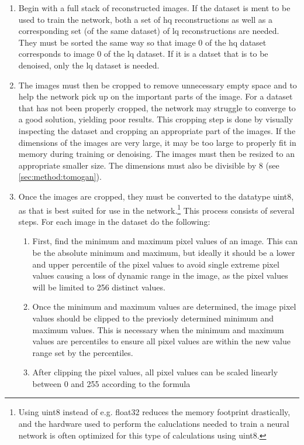 \begin{enumerate}
    \item Begin with a full stack of reconstructed images. If the dataset is ment to be used to train the network, both a set of \gls{hq} reconstructions as well as a corresponding set (of the same dataset) of \gls{lq} reconstructions are needed. They must be sorted the same way so that image 0 of the \gls{hq} dataset corresponds to image 0 of the \gls{lq} dataset. If it is a datset that is to be denoised, only the \gls{lq} dataset is needed. 
    \item The images must then be cropped to remove unnecessary empty space and to help the network pick up on the important parts of the image. For a dataset that has not been properly cropped, the network may struggle to converge to a good solution, yielding poor results. This cropping step is done by visually inspecting the dataset and cropping an appropriate part of the images. If the dimensions of the images are very large, it may be too large to properly fit in memory during training or denoising. The images must then be resized to an appropriate smaller size. The dimensions must also be divisible by $8$ (see \cref{sec:method:tomogan}).
    \item Once the images are cropped, they must be converted to the datatype uint8, as that is best suited for use in the network.\footnote{Using uint8 instead of e.g. float32 reduces the memory footprint drastically, and the hardware used to perform the caluclations needed to train a neural network is often optimized for this type of calculations using uint8. } This process consists of several steps. For each image in the dataset do the following:
    \begin{enumerate}
        \item First, find the minimum and maximum pixel values of an image. This can be the absolute minimum and maximum, but ideally it should be a lower and upper percentile of the pixel values to avoid single extreme pixel values causing a loss of dynamic range in the image, as the pixel values will be limited to 256 distinct values. 
        \item Once the minimum and maximum values are determined, the image pixel values should be clipped to the previosly determined minimum and maximum values. This is necessary when the minimum and maximum values are percentiles to ensure all pixel values are within the new value range set by the percentiles.
        \item After clipping the pixel values, all pixel values can be scaled linearly between 0 and 255 according to the formula 

\end{enumerate}
\end{enumerate}
